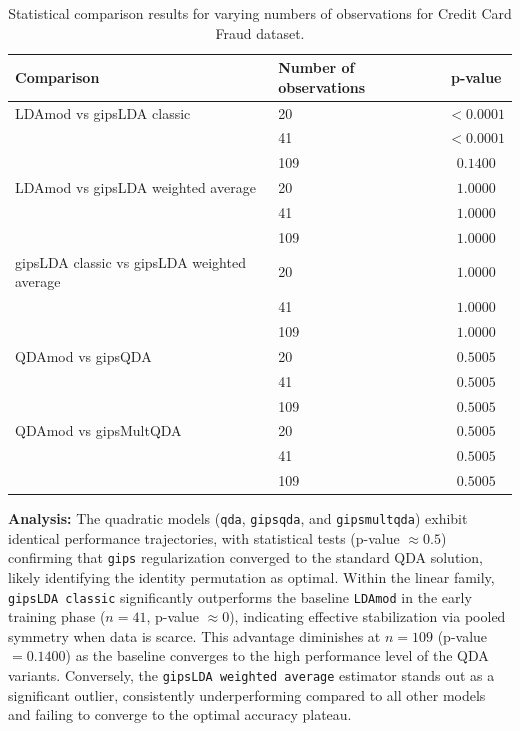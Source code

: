 \documentclass[a4paper,11pt,twoside]{report}
\theoremstyle{definition}
\begin{document}
\begin{table}[H]
    \centering
    \begin{tabular}{llc}
        \toprule
        \textbf{Comparison} & \textbf{Number of observations} & \textbf{p-value} \\
        \midrule
        LDAmod vs gipsLDA classic & 20 & $< 0.0001$ \\
                                  & 41 & $< 0.0001$ \\
                                  & 109 & $0.1400$ \\
        \midrule
        LDAmod vs gipsLDA weighted average & 20 & $1.0000$ \\
                                           & 41 & $1.0000$ \\
                                           & 109 & $1.0000$ \\
        \midrule
        gipsLDA classic vs gipsLDA weighted average & 20 & $1.0000$ \\
                                                    & 41 & $1.0000$ \\
                                                    & 109 & $1.0000$ \\
        \midrule
        QDAmod vs gipsQDA & 20 & $0.5005$ \\
                          & 41 & $0.5005$ \\
                          & 109 & $0.5005$ \\
        \midrule
        QDAmod vs gipsMultQDA & 20 & $0.5005$ \\
                              & 41 & $0.5005$ \\
                              & 109 & $0.5005$ \\
        \bottomrule
    \end{tabular}
    \caption{Statistical comparison results for varying numbers of observations for Credit Card Fraud dataset.}
\end{table}

\textbf{Analysis:}
The quadratic models (\texttt{qda}, \texttt{gipsqda}, and \texttt{gipsmultqda}) exhibit identical performance trajectories, with statistical tests (p-value $\approx 0.5$) confirming that \texttt{gips} regularization converged to the standard QDA solution, likely identifying the identity permutation as optimal. Within the linear family, \texttt{gipsLDA classic} significantly outperforms the baseline \texttt{LDAmod} in the early training phase ($n=41$, p-value $\approx 0$), indicating effective stabilization via pooled symmetry when data is scarce. This advantage diminishes at $n=109$ (p-value $= 0.1400$) as the baseline converges to the high performance level of the QDA variants. Conversely, the \texttt{gipsLDA weighted average} estimator stands out as a significant outlier, consistently underperforming compared to all other models and failing to converge to the optimal accuracy plateau.
\end{document}
